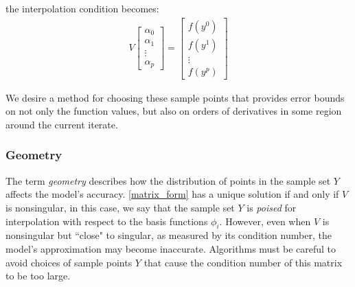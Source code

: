 \documentclass{article}
\theoremstyle{case}
\begin{document}
the interpolation condition becomes:
\begin{align}
\label{matrix_form}
V
\begin{bmatrix}
    \alpha_0     \\
    \alpha_1     \\
    \vdots       \\
    \alpha_p
\end{bmatrix}
=
\begin{bmatrix}
    f(y^0)     \\
    f(y^1)     \\
    \vdots     \\
    f(y^p)
\end{bmatrix}
\end{align}

We desire a method for choosing these sample points that provides error bounds on not only the function values, but also on orders of derivatives in some region around the current iterate.



\subsubsection{Geometry}
\label{geometry}
The term \emph{geometry} describes how the distribution of points in the sample set $Y$ affects the model's accuracy.
\cref{matrix_form} has a unique solution if and only if $V$ is nonsingular, in this case, we say that the sample set $Y$ is \emph{poised} for interpolation with respect to the basis functions $\phi_i$.
However, even when $V$ is nonsingular but ``close" to singular, as measured by its condition number, the model's approximation may become inaccurate.
Algorithms must be careful to avoid choices of sample points $Y$ that cause the condition number of this matrix to be too large.
\end{document}
